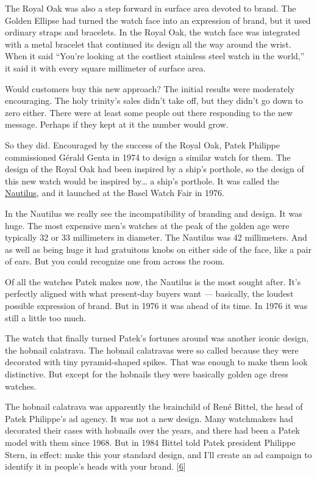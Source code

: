 The Royal Oak was also a step forward in surface area devoted to brand.
The Golden Ellipse had turned the watch face into an expression of
brand, but it used ordinary straps and bracelets. In the Royal Oak, the
watch face was integrated with a metal bracelet that continued its
design all the way around the wrist. When it said ``You're looking at
the costliest stainless steel watch in the world,'' it said it with
every square millimeter of surface area.

Would customers buy this new approach? The initial results were
moderately encouraging. The holy trinity's sales didn't take off, but
they didn't go down to zero either. There were at least some people out
there responding to the new message. Perhaps if they kept at it the
number would grow.

So they did. Encouraged by the success of the Royal Oak, Patek Philippe
commissioned Gérald Genta in 1974 to design a similar watch for them.
The design of the Royal Oak had been inspired by a ship's porthole, so
the design of this new watch would be inspired by\ldots{} a ship's
porthole. It was called the
\href{https://www.sothebys.com/en/buy/auction/2025/important-watches-2/reference-3700-11-nautilus-jumbo-a-stainless-steel}{Nautilus},
and it launched at the Basel Watch Fair in 1976.

In the Nautilus we really see the incompatibility of branding and
design. It was huge. The most expensive men's watches at the peak of the
golden age were typically 32 or 33 millimeters in diameter. The Nautilus
was 42 millimeters. And as well as being huge it had gratuitous knobs on
either side of the face, like a pair of ears. But you could recognize
one from across the room.

Of all the watches Patek makes now, the Nautilus is the most sought
after. It's perfectly aligned with what present-day buyers want ---
basically, the loudest possible expression of brand. But in 1976 it was
ahead of its time. In 1976 it was still a little too much.

The watch that finally turned Patek's fortunes around was another iconic
design, the hobnail calatrava. The hobnail calatravas were so called
because they were decorated with tiny pyramid-shaped spikes. That was
enough to make them look distinctive. But except for the hobnails they
were basically golden age dress watches.

The hobnail calatrava was apparently the brainchild of René Bittel, the
head of Patek Philippe's ad agency. It was not a new design. Many
watchmakers had decorated their cases with hobnails over the years, and
there had been a Patek model with them since 1968. But in 1984 Bittel
told Patek president Philippe Stern, in effect: make this your standard
design, and I'll create an ad campaign to identify it in people's heads
with your brand. {[}\hyperref[f6n]{6}{]}

